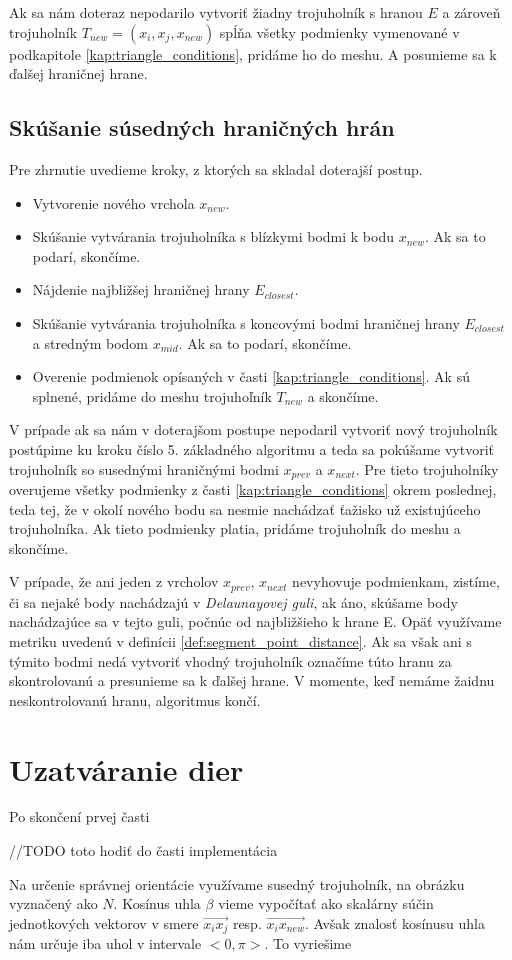 Ak sa nám doteraz nepodarilo vytvoriť žiadny trojuholník s hranou $E$ a zároveň trojuholník 
$T_{new} = (x_i, x_j, x_{new})$ spĺňa všetky podmienky vymenované v podkapitole 
\ref{kap:triangle_conditions}, pridáme ho do meshu. A posunieme sa k ďalšej hraničnej hrane.

\subsection{Skúšanie súsedných hraničných hrán}
Pre zhrnutie uvedieme kroky, z ktorých sa skladal doterajší postup.
\begin{itemize}
\item{
    Vytvorenie nového vrchola $x_{new}$.
}
\item{
    Skúšanie vytvárania trojuholníka s blízkymi bodmi k bodu $x_{new}$.
    Ak sa to podarí, skončíme. 
}
\item{
    Nájdenie najbližšej hraničnej hrany $E_{closest}$.
}
\item{
    Skúšanie vytvárania trojuholníka s koncovými bodmi hraničnej hrany $E_{closest}$ a 
    stredným bodom $x_{mid}$. Ak sa to podarí, skončíme.
}
\item{
    Overenie podmienok opísaných v časti \ref{kap:triangle_conditions}. Ak sú splnené, pridáme do 
    meshu trojuhoľník $T_{new}$ a skončíme.
}
\end{itemize}

V prípade ak sa nám v doterajšom postupe nepodaril vytvoriť nový trojuholník postúpime ku kroku 
číslo 5. základného algoritmu a teda sa pokúšame vytvoriť trojuholník so susednými hraničnými bodmi 
$x_{prev}$ a $x_{next}$. Pre tieto trojuholníky overujeme všetky podmienky z časti 
\ref{kap:triangle_conditions} okrem poslednej, teda tej, že v okolí nového bodu sa nesmie 
nachádzať ťažisko už existujúceho trojuholníka. Ak tieto podmienky platia, pridáme trojuholník 
do meshu a skončíme.

V prípade, že ani jeden z vrcholov $x_{prev}$, $x_{next}$ nevyhovuje podmienkam, zistíme, 
či sa nejaké body nachádzajú v \textit{Delaunayovej guli}, ak áno, skúšame body nachádzajúce
sa v tejto guli, počnúc od najbližšieho k hrane E. Opäť využívame metriku uvedenú v definícii 
\ref{def:segment_point_distance}. Ak sa však ani s týmito bodmi nedá vytvoriť vhodný trojuholník
označíme túto hranu za skontrolovanú a presunieme sa k ďalšej hrane. V momente, keď nemáme žaidnu 
neskontrolovanú hranu, algoritmus končí.

\section{Uzatváranie dier}

Po skončení prvej časti 

    //TODO toto hodiť do časti implementácia
    
    Na určenie správnej orientácie využívame susedný trojuholník, na obrázku vyznačený 
    ako $N$. Kosínus uhla $\beta$ vieme vypočítať ako skalárny súčin jednotkových vektorov 
    v smere $\overrightarrow{x_i x_j}$ resp. $\overrightarrow{x_i x_{new}}$. 
    Avšak znalosť kosínusu uhla nám určuje iba uhol v intervale $<0, \pi>$. To vyriešime 
